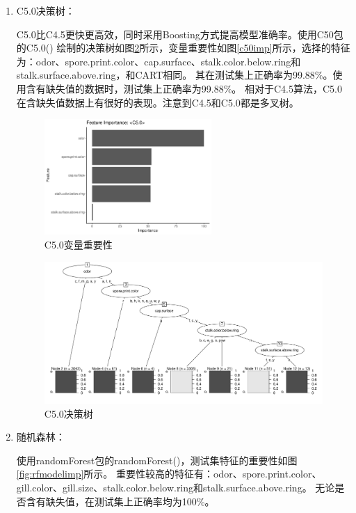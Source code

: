 \documentclass[lang=cn,11pt,a4paper,cite=super]{elegantpaper}
\begin{document}
\begin{enumerate}
   \item C5.0决策树：\par  C5.0比C4.5更快更高效，同时采用Boosting方式提高模型准确率。使用C50包的C5.0()
   绘制的决策树如图\ref{fig:c50}所示，变量重要性如图\ref{c50imp}所示，选择的特征为：odor、spore.print.color、cap.surface、stalk.color.below.ring和stalk.surface.above.ring，和CART相同。
   其在测试集上正确率为99.88\%。使用含有缺失值的数据时，测试集上正确率为99.88\%。
   相对于C4.5算法，C5.0在含缺失值数据上有很好的表现。注意到C4.5和C5.0都是多叉树。
   \begin{figure}[htb]
      \centering
      \includegraphics[width=0.6\textwidth]{img/c50imp-1.pdf}
      \caption{C5.0变量重要性}
      \label{fig:c50imp}
   \end{figure} 
   \begin{figure}[hbt]
      \centering
      \includegraphics[width=\textwidth]{img/c50.pdf}
      \caption{C5.0决策树}
      \label{fig:c50}
   \end{figure} 
   \item 随机森林：\par  使用randomForest包的randomForest()，测试集特征的重要性如图\ref{fig:rfmodelimp}所示。  
   重要性较高的特征有：odor、spore.print.color、gill.color、gill.size、stalk.color.below.ring和stalk.surface.above.ring。
   无论是否含有缺失值，在测试集上正确率均为100\%。

\end{enumerate}
\end{document}
